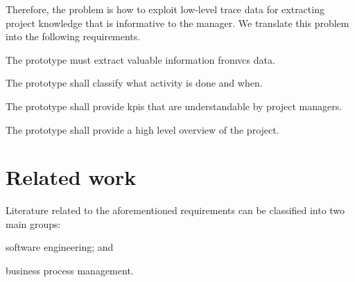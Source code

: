 Therefore, the problem is how to exploit low-level trace data for extracting project knowledge that is informative to the manager. We translate this problem into the following requirements.

\noindent
\begin{inparadesc}
\item[R1. (Processing of \gls{vcs} event logs).] The prototype must extract valuable information from\gls{vcs} data. \\
\item[R2. (Identification of the activities).] The prototype shall classify what activity is done and when.\\
\item[R3. (Computation of KPIs).] The prototype shall provide \glspl{kpi} that are understandable by project managers.\\
\item[R4. (Visualization of project status).] The prototype shall provide a high level overview of the project.
\end{inparadesc}



\section{Related work}
\label{subsec:requirements}

Literature related to the aforementioned requirements can be classified into two main groups: \begin{inparaenum}[\itshape (i)]
\item software engineering; and 
\item business process management.
\end{inparaenum} 

% 

